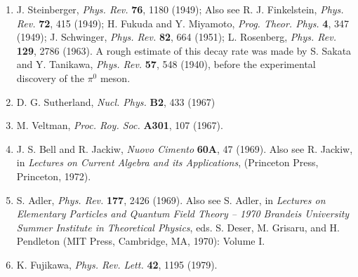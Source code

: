 


\begin{enumerate}
\item {}\label{ch22-ref-1}
J. Steinberger, \emph{Phys. Rev.} \textbf{76}, 1180 (1949); Also see
R. J. Finkelstein, \emph{Phys. Rev.} \textbf{72}, 415 (1949);
H. Fukuda and Y. Miyamoto, \emph{Prog. Theor. Phys.} \textbf{4}, 347
(1949); J. Schwinger, \emph{Phys. Rev.} \textbf{82}, 664 (1951);
L. Rosenberg, \emph{Phys. Rev.} \textbf{129}, 2786 (1963). A rough
estimate of this decay rate was made by S. Sakata and Y. Tanikawa,
\emph{Phys. Rev.} \textbf{57}, 548 (1940), before the experimental
discovery of the $\pi^0$ meson.

\item {}\label{ch22-ref-2}
D. G. Sutherland, \emph{Nucl. Phys.} \textbf{B2}, 433 (1967)

\item {}\label{ch22-ref-3}
M. Veltman, \emph{Proc. Roy. Soc.} \textbf{A301}, 107 (1967).

\item {}\label{ch22-ref-4}
J. S. Bell and R. Jackiw, \emph{Nuovo Cimento} \textbf{60A}, 47 (1969).
Also see R. Jackiw, in \emph{Lectures on Current Algebra and its
Applications}, (Princeton Press, Princeton, 1972).

\item {}\label{ch22-ref-5}
S. Adler, \emph{Phys. Rev.} \textbf{177}, 2426 (1969). Also see S. Adler,
in \emph{Lectures on Elementary Particles and Quantum Field Theory --
1970 Brandeis University Summer Institute in Theoretical Physics}, eds.
S. Deser, M. Grisaru, and H. Pendleton (MIT Press, Cambridge, MA, 1970):
Volume I.

\item {}\label{ch22-ref-6}
K. Fujikawa, \emph{Phys. Rev. Lett.} \textbf{42}, 1195 (1979).


\end{enumerate}

